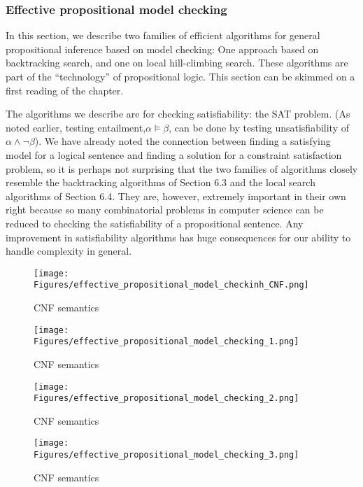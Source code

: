 \subsubsection{Effective propositional model checking}


In this section, we describe two families of efficient algorithms for general propositional
inference based on model checking: One approach based on backtracking search, and one
on local hill-climbing search. These algorithms are part of the “technology” of propositional
logic. This section can be skimmed on a first reading of the chapter.


The algorithms we describe are for checking satisfiability: the SAT problem. (As noted
earlier, testing entailment,$\alpha \models \beta$, can be done by testing unsatisfiability of $\alpha \wedge \neg \beta$). We
have already noted the connection between finding a satisfying model for a logical sentence
and finding a solution for a constraint satisfaction problem, so it is perhaps not surprising that
the two families of algorithms closely resemble the backtracking algorithms of Section 6.3
and the local search algorithms of Section 6.4. They are, however, extremely important in
their own right because so many combinatorial problems in computer science can be reduced
to checking the satisfiability of a propositional sentence. Any improvement in satisfiability
algorithms has huge consequences for our ability to handle complexity in general.


\begin{figure}[H]
    \centering
    \texttt{[image: Figures/effective\_propositional\_model\_checkinh\_CNF.png]}
    \caption{CNF semantics}
    \label{fig:CNF}
\end{figure}



\begin{figure}[H]
    \centering
    \texttt{[image: Figures/effective\_propositional\_model\_checking\_1.png]}
    \caption{CNF semantics}
    \label{fig:CNF}
\end{figure}

\begin{figure}[H]
    \centering
    \texttt{[image: Figures/effective\_propositional\_model\_checking\_2.png]}
    \caption{CNF semantics}
    \label{fig:CNF}
\end{figure}

\begin{figure}[H]
    \centering
    \texttt{[image: Figures/effective\_propositional\_model\_checking\_3.png]}
    \caption{CNF semantics}
    \label{fig:CNF}
\end{figure}

